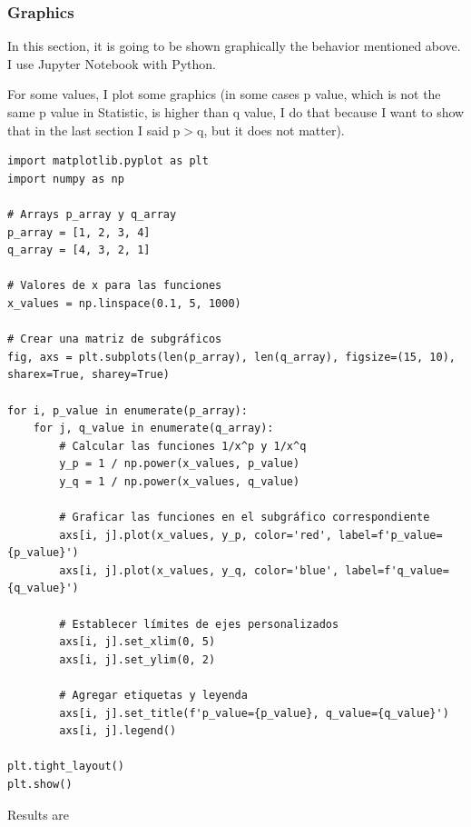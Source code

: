 \documentclass{article}
\begin{document}
\subsubsection{Graphics}

In this section, it is going to be shown graphically the behavior mentioned above. I use Jupyter Notebook with Python.

For some values, I plot some graphics (in some cases p value, which is not the same p value in Statistic, is higher than q value, I do that because I want to show that in the last section I said p\(>\)q, but it does not matter).

\begin{verbatim}
import matplotlib.pyplot as plt
import numpy as np

# Arrays p_array y q_array
p_array = [1, 2, 3, 4]
q_array = [4, 3, 2, 1]

# Valores de x para las funciones
x_values = np.linspace(0.1, 5, 1000)

# Crear una matriz de subgráficos
fig, axs = plt.subplots(len(p_array), len(q_array), figsize=(15, 10), sharex=True, sharey=True)

for i, p_value in enumerate(p_array):
    for j, q_value in enumerate(q_array):
        # Calcular las funciones 1/x^p y 1/x^q
        y_p = 1 / np.power(x_values, p_value)
        y_q = 1 / np.power(x_values, q_value)
        
        # Graficar las funciones en el subgráfico correspondiente
        axs[i, j].plot(x_values, y_p, color='red', label=f'p_value={p_value}')
        axs[i, j].plot(x_values, y_q, color='blue', label=f'q_value={q_value}')
        
        # Establecer límites de ejes personalizados
        axs[i, j].set_xlim(0, 5)
        axs[i, j].set_ylim(0, 2)
        
        # Agregar etiquetas y leyenda
        axs[i, j].set_title(f'p_value={p_value}, q_value={q_value}')
        axs[i, j].legend()

plt.tight_layout()
plt.show()
\end{verbatim}

Results are
\end{document}
